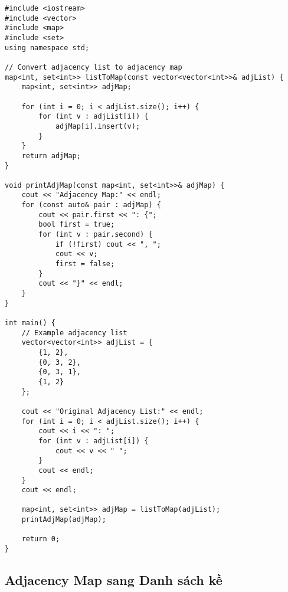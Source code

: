 \documentclass[12pt]{article}
\begin{document}
\begin{lstlisting}[caption={Chuyển đổi từ Danh sách kề sang Adjacency Map}]
#include <iostream>
#include <vector>
#include <map>
#include <set>
using namespace std;

// Convert adjacency list to adjacency map
map<int, set<int>> listToMap(const vector<vector<int>>& adjList) {
    map<int, set<int>> adjMap;
    
    for (int i = 0; i < adjList.size(); i++) {
        for (int v : adjList[i]) {
            adjMap[i].insert(v);
        }
    }
    return adjMap;
}

void printAdjMap(const map<int, set<int>>& adjMap) {
    cout << "Adjacency Map:" << endl;
    for (const auto& pair : adjMap) {
        cout << pair.first << ": {";
        bool first = true;
        for (int v : pair.second) {
            if (!first) cout << ", ";
            cout << v;
            first = false;
        }
        cout << "}" << endl;
    }
}

int main() {
    // Example adjacency list
    vector<vector<int>> adjList = {
        {1, 2},
        {0, 3, 2},
        {0, 3, 1},
        {1, 2}
    };
    
    cout << "Original Adjacency List:" << endl;
    for (int i = 0; i < adjList.size(); i++) {
        cout << i << ": ";
        for (int v : adjList[i]) {
            cout << v << " ";
        }
        cout << endl;
    }
    cout << endl;
    
    map<int, set<int>> adjMap = listToMap(adjList);
    printAdjMap(adjMap);
    
    return 0;
}
\end{lstlisting}

\subsection{Adjacency Map sang Danh sách kề}
\end{document}
